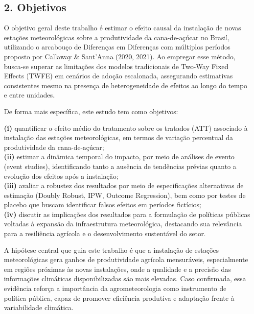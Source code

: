 \documentclass[
  brazilian,
  12pt,
  a4paper,
]{article}
\begin{document}
\subsection{}\label{section}

\subsection{\texorpdfstring{\textbf{2.
Objetivos}}{2. Objetivos}}\label{objetivos}

O objetivo geral deste trabalho é estimar o efeito causal da instalação
de novas estações meteorológicas sobre a produtividade da cana-de-açúcar
no Brasil, utilizando o arcabouço de Diferenças em Diferenças com
múltiplos períodos proposto por Callaway \& Sant'Anna (2020, 2021). Ao
empregar esse método, busca-se superar as limitações dos modelos
tradicionais de Two-Way Fixed Effects (TWFE) em cenários de adoção
escalonada, assegurando estimativas consistentes mesmo na presença de
heterogeneidade de efeitos ao longo do tempo e entre unidades.

De forma mais específica, este estudo tem como objetivos:

\textbf{(i)} quantificar o efeito médio do tratamento sobre os tratados
(ATT) associado à instalação das estações meteorológicas, em termos de
variação percentual da produtividade da cana-de-açúcar;\\
\textbf{(ii)} estimar a dinâmica temporal do impacto, por meio de
análises de evento (event studies), identificando tanto a ausência de
tendências prévias quanto a evolução dos efeitos após a instalação;\\
\textbf{(iii)} avaliar a robustez dos resultados por meio de
especificações alternativas de estimação (Doubly Robust, IPW, Outcome
Regression), bem como por testes de placebo que buscam identificar
falsos efeitos em períodos fictícios;\\
\textbf{(iv)} discutir as implicações dos resultados para a formulação
de políticas públicas voltadas à expansão da infraestrutura
meteorológica, destacando sua relevância para a resiliência agrícola e o
desenvolvimento sustentável do setor.

A hipótese central que guia este trabalho é que a instalação de estações
meteorológicas gera ganhos de produtividade agrícola mensuráveis,
especialmente em regiões próximas às novas instalações, onde a qualidade
e a precisão das informações climáticas disponibilizadas são mais
elevadas. Caso confirmada, essa evidência reforça a importância da
agrometeorologia como instrumento de política pública, capaz de promover
eficiência produtiva e adaptação frente à variabilidade climática.
\end{document}
